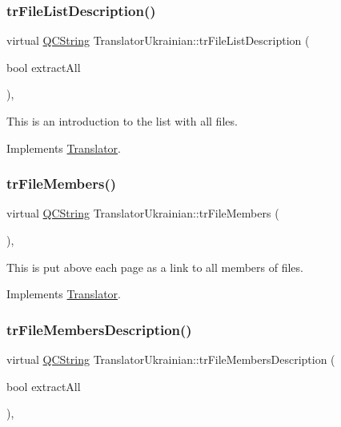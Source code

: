 \subsubsection{\texorpdfstring{trFileListDescription()}{trFileListDescription()}}
{\footnotesize\ttfamily virtual \mbox{\hyperlink{class_q_c_string}{Q\+C\+String}} Translator\+Ukrainian\+::tr\+File\+List\+Description (\begin{DoxyParamCaption}\item[{bool}]{extract\+All }\end{DoxyParamCaption})\hspace{0.3cm}{\ttfamily [inline]}, {\ttfamily [virtual]}}

This is an introduction to the list with all files. 

Implements \mbox{\hyperlink{class_translator}{Translator}}.

\mbox{\label{class_translator_ukrainian_aa917bf05ad886c8e1c70867b28f2de3f}} 
\subsubsection{\texorpdfstring{trFileMembers()}{trFileMembers()}}
{\footnotesize\ttfamily virtual \mbox{\hyperlink{class_q_c_string}{Q\+C\+String}} Translator\+Ukrainian\+::tr\+File\+Members (\begin{DoxyParamCaption}{ }\end{DoxyParamCaption})\hspace{0.3cm}{\ttfamily [inline]}, {\ttfamily [virtual]}}

This is put above each page as a link to all members of files. 

Implements \mbox{\hyperlink{class_translator}{Translator}}.

\mbox{\label{class_translator_ukrainian_a3039468143c6faba8d82259f797a117d}} 
\subsubsection{\texorpdfstring{trFileMembersDescription()}{trFileMembersDescription()}}
{\footnotesize\ttfamily virtual \mbox{\hyperlink{class_q_c_string}{Q\+C\+String}} Translator\+Ukrainian\+::tr\+File\+Members\+Description (\begin{DoxyParamCaption}\item[{bool}]{extract\+All }\end{DoxyParamCaption})\hspace{0.3cm}{\ttfamily [inline]}, {\ttfamily [virtual]}}

